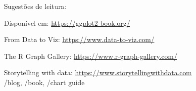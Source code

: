\begin{frame}
Sugestões de leitura: 
\vspace{2ex}

Disponível em: \url{https://ggplot2-book.org/}

\vspace{3ex}

\vspace{3ex}
From Data to Viz: \url{https://www.data-to-viz.com/}

\vspace{3ex}
The R Graph Gallery: \url{https://www.r-graph-gallery.com/}

\vspace{3ex}
Storytelling with data: \url{https://www.storytellingwithdata.com}\\
/blog, /book, /chart guide

\end{frame}
